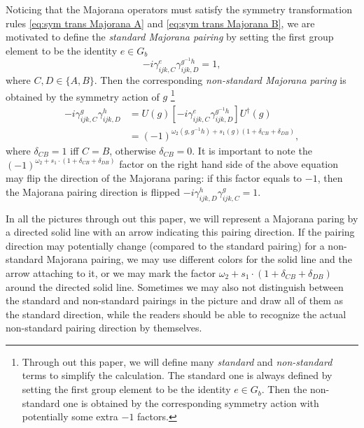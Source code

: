 \documentclass[%
 reprint,
 amsmath,amssymb,
 aps,
prb,
]{revtex4-2}
\begin{document}
Noticing that the Majorana operators must satisfy the symmetry transformation rules \eqref{eq:sym trans Majorana A} and \eqref{eq:sym trans Majorana B}, we are motivated to define the \textit{standard Majorana pairing} by setting the first group element to be the identity $e \in G_{b}$
\begin{equation}
-i\gamma _{ijk,C}^{e } \gamma _{ijk,D}^{g^{-1} h } = 1 ,
\end{equation}
where $C,D \in \{A, B\}$.
Then the corresponding \textit{non-standard Majorana paring} is obtained by the symmetry action of $g$ 
\footnote{Through out this paper, we will define many \textit{standard} and \textit{non-standard} terms to simplify the calculation. The standard one is always defined by setting the first group element to be the identity $e \in G_b$. Then the non-standard one is obtained by the corresponding symmetry action with potentially some extra $-1$ factors.}
\begin{align}
-i\gamma _{ijk,C}^{g } \gamma _{ijk,D}^{h }
&= U(g) \left[-i\gamma _{ijk,C}^{e } \gamma _{ijk,D}^{g^{-1} h }\right] U^{\dagger}(g) \nonumber \\
&= (-1)^{\omega_{2}(g, g^{-1} h) + s_{1}(g) (1 + \delta_{CB} + \delta_{DB})} , \label{eq:non-standard pairing}
\end{align}
where $\delta_{CB} = 1$ iff $C = B$, otherwise $\delta_{CB} = 0$.
It is important to note the $(-1)^{\omega_{2} + s_{1} \cdot (1 + \delta_{CB} + \delta_{DB})}$ factor on the right hand side of the above equation may flip the direction of the Majorana paring: if this factor equals to $-1$, then the Majorana pairing direction is flipped $-i\gamma _{ijk,D}^{h } \gamma _{ijk,C}^{g } = 1$.

In all the pictures through out this paper, we will represent a Majorana paring by a directed solid line with an arrow indicating this pairing direction.
If the pairing direction may potentially change (compared to the standard pairing) for a non-standard Majorana pairing, we may use different colors for the solid line and the arrow attaching to it, or we may mark the factor $\omega_{2} + s_{1} \cdot (1 + \delta_{CB} + \delta_{DB})$ around the directed solid line.
Sometimes we may also not distinguish between the standard and non-standard pairings in the picture and draw all of them as the standard direction, while the readers should be able to recognize the actual non-standard pairing direction by themselves.
\end{document}
